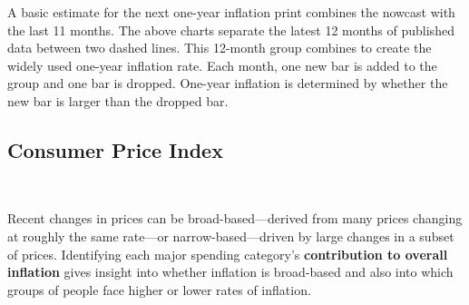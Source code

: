 \begin{minipage}{0.76\textwidth}
\vspace{1.5mm}

\small A basic estimate for the next one-year inflation print combines the nowcast with the last 11 months. The above charts separate the latest 12 months of published data between two dashed lines. This 12-month group combines to create the widely used one-year inflation rate. Each month, one new bar is added to the group and one bar is dropped. One-year inflation is determined by whether the new bar is larger than the dropped bar.  
\end{minipage}
\newpage


\subsection*{Consumer Price Index}
\begin{minipage}{0.76\textwidth}
\small 
\vspace{1mm}

\\
\vspace{3.2cm}

\hspace{5mm} 

\vspace{2mm}

\small Recent changes in prices can be broad-based---derived from many prices changing at roughly the same rate---or narrow-based---driven by large changes in a subset of prices. Identifying each major spending category's \textbf{contribution to overall inflation} gives insight into whether inflation is broad-based and also into which groups of people face higher or lower rates of inflation.
\end{minipage}
\vspace{1mm}

